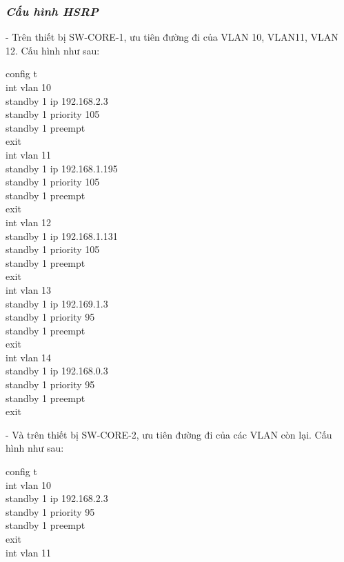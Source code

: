 \documentclass[12pt, a4paper]{article}
\begin{document}
	\subsubsection{\textit{Cấu hình HSRP}}
	\begin{flushleft}
		- Trên thiết bị SW-CORE-1, ưu tiên đường đi của VLAN 10, VLAN11, VLAN 12. Cấu hình như sau:
		\begin{tcolorbox}
			config t \\
			int vlan 10\\
			standby 1 ip 192.168.2.3\\
			standby 1 priority 105\\
			standby 1 preempt\\
			exit\\
			int vlan 11\\
			standby 1 ip 192.168.1.195\\
			standby 1 priority 105\\
			standby 1 preempt\\
			exit\\
			int vlan 12\\
			standby 1 ip 192.168.1.131\\
			standby 1 priority 105\\
			standby 1 preempt\\
			exit\\
			int vlan 13\\
			standby 1 ip 192.169.1.3\\
			standby 1 priority 95\\
			standby 1 preempt\\
			exit\\
			int vlan 14 \\
			standby 1 ip 192.168.0.3\\
			standby 1 priority 95\\
			standby 1 preempt\\
			exit
		\end{tcolorbox}
		- Và trên thiết bị SW-CORE-2, ưu tiên đường đi của các VLAN còn lại. Cấu hình như sau:
		\begin{tcolorbox}
			\setstretch{1.3}
			config t\\
			int vlan 10\\
			standby 1 ip 192.168.2.3\\
			standby 1 priority 95\\
			standby 1 preempt\\
			exit\\
			int vlan 11\\

\end{tcolorbox}
\end{flushleft}
\end{document}

